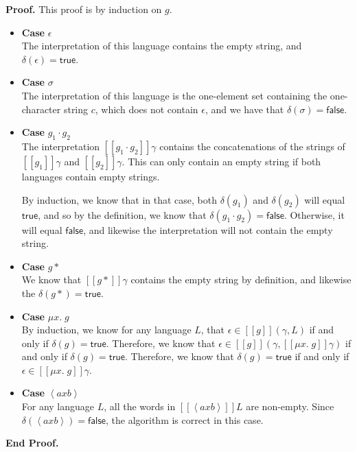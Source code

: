 \documentclass{article}
\newcommand{\fix}[2]{\mu {#1}.\;{#2}}
\newcommand{\lft}[1]{\left<{#1}\right.}
\newcommand{\rgt}[1]{\left.{#1}\right>}
\newcommand{\true}{\mathsf{true}}
\newcommand{\false}{\mathsf{false}}
\newcommand{\interp}[1]{[\![{#1}]\!]}
\newcommand{\emptify}[1]{\delta({#1})}
\newenvironment{proof}{\noindent\textbf{Proof.}}
{\noindent\textbf{End Proof.}}
\newenvironment{caseblock}{\begin{itemize}}{\end{itemize}}
\newenvironment{case}[1]{\item \textbf{Case} {#1}\\}{}
\begin{document}
\begin{proof}
This proof is by induction on $g$. 
\begin{caseblock}
  \begin{case}{$\epsilon$}
    The interpretation of this language contains the empty string, and $\emptify{\epsilon} = \true$. 
  \end{case}

  \begin{case}{$\sigma$}
    The interpretation of this language is the one-element set containing the one-character string $c$, 
    which does not contain $\epsilon$, and we have that $\emptify{\sigma} = \false$. 
  \end{case}

  \begin{case}{$g_1\cdot g_2$}
    The interpretation $\interp{g_1\cdot g_2}\gamma$ contains the concatenations of the strings of
    $\interp{g_1}\gamma$ and $\interp{g_2}\gamma$. This can only contain an empty string if both 
    languages contain empty strings. 

    By induction, we know that in that case, both $\emptify{g_1}$ and $\emptify{g_2}$ will equal $\true$, 
    and so by the definition, we know that $\emptify{g_1\cdot g_2} = \false$. Otherwise, it will equal
    $\false$, and likewise the interpretation will not contain the empty string.
  \end{case}

  \begin{case}{$g*$}
    We know that $\interp{g*}\gamma$ contains the empty string by definition, and likewise the 
    $\emptify{g*} = \true$. 
  \end{case}

  \begin{case}{$\fix{x}{g}$}
    By induction, we know for any language $L$, that $\epsilon \in \interp{g}(\gamma, L)$  if and 
    only if $\emptify{g} = \true$. Therefore, we know that 
    $\epsilon \in \interp{g}(\gamma, \interp{\fix{x}{g}}\gamma)$ if and only if $\emptify{g} = \true$. 
    Therefore, we know that $\emptify{g} = \true$ if and only if $\epsilon \in \interp{\fix{x}{g}}\gamma$. 
  \end{case}

  \begin{case}{$\lft{a}x\rgt{b}$}
    For any language $L$, all the words in $\interp{\lft{a}x\rgt{b}}L$ are non-empty. 
    Since $\emptify{\lft{a}x\rgt{b}} = \false$, the algorithm is correct in this case. 
  \end{case}


\end{caseblock}
\end{proof}
\end{document}
